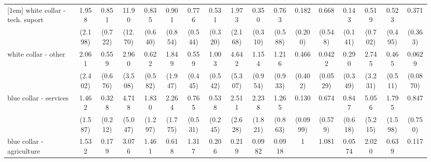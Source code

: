 {\begin{tabular}{l*{16}{c}}
[1em]
white collar - tech. suport&       1.958         &       0.851         &       11.90\sym{*}  &       0.835         &       0.901         &       0.776         &       0.531         &       1.973         &       0.350         &       0.763         &       0.182         &       0.668         &       0.143\sym{*}  &       0.519         &       0.523         &       0.371         \\
                    &     (2.198)         &     (0.722)         &     (12.70)         &     (0.640)         &     (0.854)         &     (0.544)         &     (0.320)         &     (2.168)         &     (0.310)         &     (0.588)         &     (0.200)         &     (0.548)         &     (0.141)         &     (0.702)         &     (0.495)         &     (0.363)         \\
[1em]
white collar - other&       2.061         &       0.559         &       2.960         &       0.622         &       1.849         &       0.559         &       1.003         &       4.642         &       1.154         &       1.216         &       0.466         &      0.0422\sym{*}  &       0.290         &       2.745         &       0.465         &      0.0629\sym{*}  \\
                    &     (2.402)         &     (0.676)         &     (3.508)         &     (0.582)         &     (1.947)         &     (0.445)         &     (0.542)         &     (5.307)         &     (0.954)         &     (0.933)         &     (0.402)         &    (0.0529)         &     (0.349)         &     (3.231)         &     (0.511)         &    (0.0870)         \\
[1em]
blue collar - services&       1.462         &       0.328         &       4.718         &       1.830         &       2.264         &       0.765         &       0.538         &       2.511         &       2.238         &       1.265         &       0.130\sym{**} &       0.674         &       0.847         &       5.056         &       1.795         &       0.847         \\
                    &     (1.587)         &     (0.212)         &     (5.047)         &     (1.297)         &     (1.775)         &     (0.531)         &     (0.245)         &     (2.628)         &     (1.821)         &     (0.863)         &    (0.0999)         &     (0.579)         &     (0.618)         &     (5.215)         &     (1.598)         &     (0.750)         \\
[1em]
blue collar - agriculture&       1.532         &       0.179         &       3.076         &       1.461         &       0.618         &       1.317         &       0.206         &       0.219         &      0.0982         &      0.0918\sym{*}  &           1         &       1.081         &      0.0574\sym{*}  &       2.020         &       0.639         &       0.117         \\

\end{tabular}}
